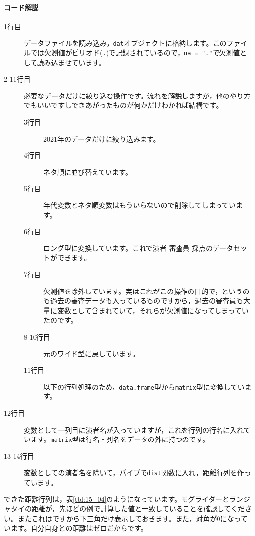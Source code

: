 \documentclass{ltjsbook}
\begin{document}
\paragraph{コード解説}
\begin{description}
	\item[1行目] データファイルを読み込み，\verb|dat|オブジェクトに格納します。このファイルでは欠測値がピリオド(\verb|.|)で記録されているので，\verb|na = "."|で欠測値として読み込ませています。
	\item[2-11行目] 必要なデータだけに絞り込む操作です。流れを解説しますが，他のやり方でもいいですしできあがったものが何かだけわかれば結構です。
	      \begin{description}
		      \item[3行目] 2021年のデータだけに絞り込みます。
		      \item[4行目] ネタ順に並び替えています。
		      \item[5行目] 年代変数とネタ順変数はもういらないので削除してしまっています。
		      \item[6行目] ロング型に変換しています。これで演者-審査員-採点のデータセットができます。
		      \item[7行目] 欠測値を除外しています。実はこれがこの操作の目的で，というのも過去の審査データも入っているものですから，過去の審査員も大量に変数として含まれていて，それらが欠測値になってしまっていたのです。
		      \item[8-10行目] 元のワイド型に戻しています。
		      \item[11行目] 以下の行列処理のため，\verb|data.frame|型から\verb|matrix|型に変換しています。
	      \end{description}
	\item[12行目] 変数として一列目に演者名が入っていますが，これを行列の行名に入れています。\verb|matrix|型は行名・列名をデータの外に持つのです。
	\item[13-14行目] 変数としての演者名を除いて，パイプで\verb|dist|関数に入れ，距離行列を作っています。
\end{description}
できた距離行列は，表\ref{tbl:15_04}のようになっています。モグライダーとランジャタイの距離が，先ほどの例で計算した値と一致していることを確認してください。またこれはですから下三角だけ表示しておきます。また，対角が$0$になっています。自分自身との距離はゼロだからです。
\end{document}
